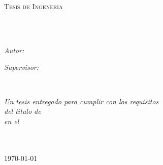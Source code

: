 \documentclass[
11pt, %
spanish, %
singlespacing, %
headsepline, %
]{MastersDoctoralThesis} %
\author{Nicholas \textsc{Spalding Earley-Dolenc}} %
\begin{document}
\frontmatter %

\pagestyle{plain} %


\begin{titlepage}
\begin{center}

\vspace*{.06\textheight}
{\scshape\LARGE \univname\par}\vspace{1.5cm} %
\textsc{\Large Tesis de Ingeneria}\\[0.5cm] %

\HRule \\[0.4cm] %
{\huge \bfseries \ttitle\par}\vspace{0.4cm} %
\HRule \\[1.5cm] %
 
\begin{minipage}[t]{0.4\textwidth}
\begin{flushleft} \large
\emph{Autor:}\\
\href{https://github.com/nishedcob}{\authorname} %
\end{flushleft}
\end{minipage}
\begin{minipage}[t]{0.4\textwidth}
\begin{flushright} \large
\emph{Supervisor:} \\
\href{https://github.com/nishedcob}{\supname} %
\end{flushright}
\end{minipage}\\[3cm]
 
\vfill

\large \textit{Un tesis entregado para cumplir con los requisitos\\ del titulo de \degreename}\\[0.3cm] %
\textit{en el}\\[0.4cm]
\groupname\\\deptname\\[2cm] %
 
\vfill

{\large \today}\\[4cm] %
 
\vfill
\end{center}
\end{titlepage}
\end{document}
